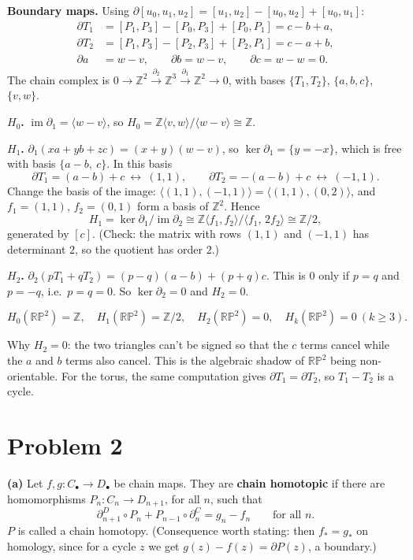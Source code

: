 \documentclass[11pt]{article}
\newcommand{\Z}{\mathbb Z}
\newcommand{\RP}{\mathbb{RP}}
\newcommand{\im}{\operatorname{im}}
\begin{document}
\textbf{Boundary maps.} Using $\partial[u_0,u_1,u_2]=[u_1,u_2]-[u_0,u_2]+[u_0,u_1]$:
\begin{align*}
\partial T_1&=[P_1,P_3]-[P_0,P_3]+[P_0,P_1]=c-b+a,\\
\partial T_2&=[P_1,P_3]-[P_2,P_3]+[P_2,P_1]=c-a+b,\\
\partial a&=w-v,\qquad \partial b=w-v,\qquad \partial c=w-w=0.
\end{align*}
The chain complex is $0\to\Z^2\xrightarrow{\partial_2}\Z^3\xrightarrow{\partial_1}\Z^2\to0$, with bases $\{T_1,T_2\}$, $\{a,b,c\}$, $\{v,w\}$.

\textbf{$H_0$.} $\im\partial_1=\langle w-v\rangle$, so $H_0=\Z\langle v,w\rangle/\langle w-v\rangle\cong\Z$.

\textbf{$H_1$.} $\partial_1(xa+yb+zc)=(x+y)(w-v)$, so $\ker\partial_1=\{y=-x\}$, which is free with basis $\{a-b,\ c\}$. In this basis
\[\partial T_1=(a-b)+c\ \leftrightarrow\ (1,1),\qquad \partial T_2=-(a-b)+c\ \leftrightarrow\ (-1,1).\]
Change the basis of the image: $\langle(1,1),(-1,1)\rangle=\langle(1,1),(0,2)\rangle$, and $f_1=(1,1)$, $f_2=(0,1)$ form a basis of $\Z^2$. Hence
\[H_1=\ker\partial_1/\im\partial_2\cong\Z\langle f_1,f_2\rangle/\langle f_1,\,2f_2\rangle\cong\Z/2,\]
generated by $[c]$. (Check: the matrix with rows $(1,1)$ and $(-1,1)$ has determinant $2$, so the quotient has order $2$.)

\textbf{$H_2$.} $\partial_2(pT_1+qT_2)=(p-q)(a-b)+(p+q)c$. This is $0$ only if $p=q$ and $p=-q$, i.e.\ $p=q=0$. So $\ker\partial_2=0$ and $H_2=0$.

\[\boxed{H_0(\RP^2)=\Z,\quad H_1(\RP^2)=\Z/2,\quad H_2(\RP^2)=0,\quad H_k(\RP^2)=0\ (k\ge3).}\]

\begin{note}
Why $H_2=0$: the two triangles can't be signed so that the $c$ terms cancel while the $a$ and $b$ terms also cancel. This is the algebraic shadow of $\RP^2$ being non-orientable. For the torus, the same computation gives $\partial T_1=\partial T_2$, so $T_1-T_2$ is a cycle.
\end{note}

\section*{Problem 2}

\textbf{(a)} Let $f,g:C_\bullet\to D_\bullet$ be chain maps. They are \textbf{chain homotopic} if there are homomorphisms $P_n:C_n\to D_{n+1}$, for all $n$, such that
\[\partial^D_{n+1}\circ P_n+P_{n-1}\circ\partial^C_n=g_n-f_n\qquad\text{for all }n.\]
$P$ is called a chain homotopy. (Consequence worth stating: then $f_*=g_*$ on homology, since for a cycle $z$ we get $g(z)-f(z)=\partial P(z)$, a boundary.)
\end{document}
